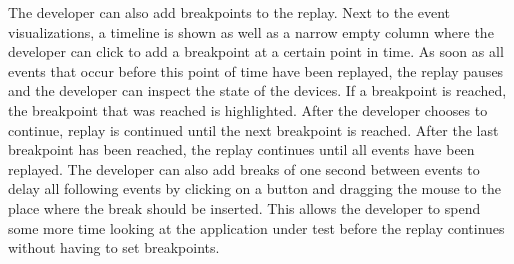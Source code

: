 The developer can also add breakpoints to the replay. Next to the event visualizations, a timeline is shown as well as a narrow empty column where the developer can click to add a breakpoint at a certain point in time. As soon as all events that occur before this point of time have been replayed, the replay pauses and the developer can inspect the state of the devices. If a breakpoint is reached, the breakpoint that was reached is highlighted. After the developer chooses to continue, replay is continued until the next breakpoint is reached. After the last breakpoint has been reached, the replay continues until all events have been replayed. The developer can also add breaks of one second between events to delay all following events by clicking on a button and dragging the mouse to the place where the break should be inserted. This allows the developer to spend some more time looking at the application under test before the replay continues without having to set breakpoints. 